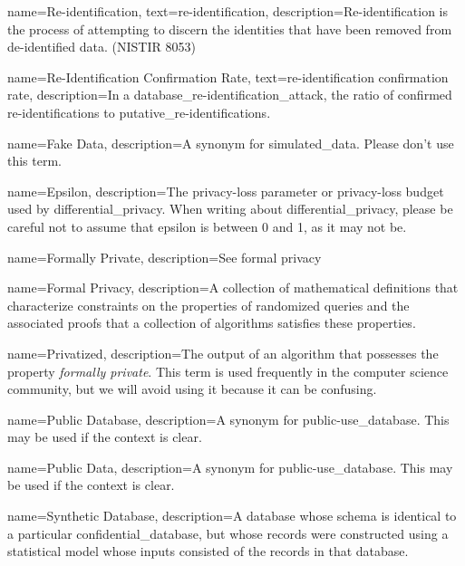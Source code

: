 {
   name=Re-identification,
   text=re-identification,
   description={Re-identification is the process of attempting to
   discern the identities that have been removed from de-identified
   data. (NISTIR 8053)}
}

{
    name=Re-Identification Confirmation Rate,
    text=re-identification confirmation rate,
   description={In a \gls{database_re-identification_attack}, the ratio of confirmed \glspl{re-identification} to \glspl{putative_re-identification}.}
}

{
    name=Fake Data,
    description={A synonym for \gls{simulated_data}. Please don't use this term.}
}

{
    name=Epsilon,
    description={The privacy-loss parameter or privacy-loss budget used by \gls{differential_privacy}. When writing about \gls{differential_privacy}, please be careful not to assume that epsilon is between 0 and 1, as it may not be.}
}

{
    name=Formally Private,
    description={See formal privacy}
}

{
    name=Formal Privacy,
    description={A collection of mathematical definitions that characterize constraints on the properties of randomized queries and the associated proofs that a collection of algorithms satisfies these properties.}
}

{
    name=Privatized,
    description={The output of an algorithm that possesses the property \emph{formally private}. This term is used frequently in the computer science community, but we will avoid using it because it can be confusing.}
}

{
    name=Public Database,
    description={A synonym for \gls{public-use_database}. This may be used if the context is clear.}
}

{
    name=Public Data,
    description={A synonym for \gls{public-use_database}. This may be used if the context is clear.}
}

{
    name=Synthetic Database,
    description={A \gls{database} whose schema is identical to a particular \gls{confidential_database}, but whose \glspl{record} were constructed using a statistical model whose inputs consisted of the records in that database.}
}

